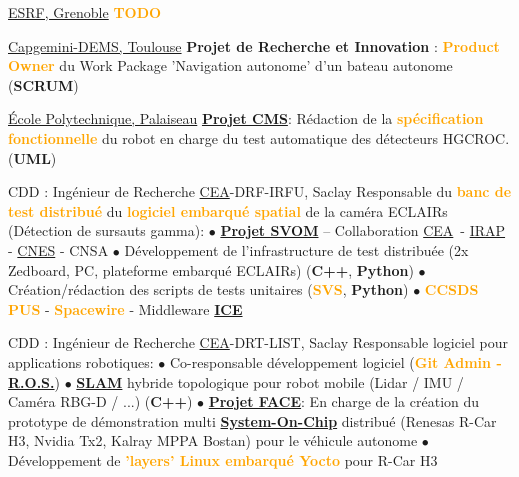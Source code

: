 \documentclass[
	a4paper,
	subsectioncolor=cvblue!70,
]{fortysecondscv}
\newcommand{\cea}{\href{http://www.cea.fr/}{CEA}}
\newcommand{\ros}{\href{http://www.ros.org/}{R.O.S.}}
\newcommand{\hl}[1]{\textbf{\textcolor{orange}{#1}}}
\begin{document}
\begin{cvtable}[2]
  {\href{https://www.esrf.fr/}{ESRF, Grenoble}}
  {
    \hl{TODO}
  }

  {\href{https://www.capgemini.com/service/digital-services/digital-engineering-and-manufacturing-services/}{Capgemini-DEMS, Toulouse}}
  {
    \textbf{Projet de Recherche et Innovation} : \hl{Product Owner} du Work Package
    'Navigation autonome' d'un bateau autonome (\textbf{SCRUM})
  }

  {\href{https://www.polytechnique.edu/fr/le-laboratoire-leprince-ringuet-llr}{École Polytechnique, Palaiseau}}
  {
    \textbf{\href{http://polywww.in2p3.fr/-cms-45-?lang=fr}{Projet CMS}}:
    Rédaction de la \hl{spécification fonctionnelle} du robot en charge du test
    automatique des détecteurs HGCROC. (\textbf{UML})
  }

  {CDD : Ingénieur de Recherche}
  {\cea-DRF-IRFU, Saclay}
  {
    Responsable du \hl{banc de test distribué} du \hl{logiciel embarqué spatial} de la
    caméra ECLAIRs (Détection de sursauts gamma):\newline
    $\bullet$ \hl{\href{http://www.svom.fr/}{Projet SVOM}} -- Collaboration \cea\
    - \href{http://www.irap.omp.eu/}{IRAP} - \href{https://cnes.fr/fr}{CNES} - CNSA\newline
    $\bullet$ Développement de l'infrastructure de test distribuée (2x Zedboard, PC,
    plateforme embarqué ECLAIRs) (\textbf{C++}, \textbf{Python})\newline
    $\bullet$ Création/rédaction des scripts de tests unitaires
    (\hl{SVS}, \textbf{Python})\newline
    $\bullet$ \hl{CCSDS PUS} - \hl{Spacewire} - Middleware
    \href{https://zeroc.com/products/ice}{\textbf{ICE}}
  }

  {CDD : Ingénieur de Recherche}
  {\cea-DRT-LIST, Saclay}
  {
    Responsable logiciel pour applications robotiques:\newline
    $\bullet$ Co-responsable développement logiciel (\hl{Git Admin - \ros})\newline
    $\bullet$ \hl{\href{https://en.wikipedia.org/wiki/Simultaneous_localization_and_mapping}{SLAM}} hybride topologique pour robot mobile (Lidar / IMU / Caméra RBG-D
    / ...) (\textbf{C++})\newline
    $\bullet$ \textbf{\href{https://www.designspot.fr/portfolio/face/}{Projet
        FACE}}: En charge de la création du prototype de démonstration multi
    \hl{\href{https://en.wikipedia.org/wiki/System_on_a_chip}{System-On-Chip}}
    distribué (Renesas R-Car H3, Nvidia Tx2, Kalray MPPA Bostan) pour le
    véhicule autonome\newline
    $\bullet$ Développement de \hl{'layers' Linux embarqué Yocto} pour R-Car H3
  }


\end{cvtable}
\end{document}
